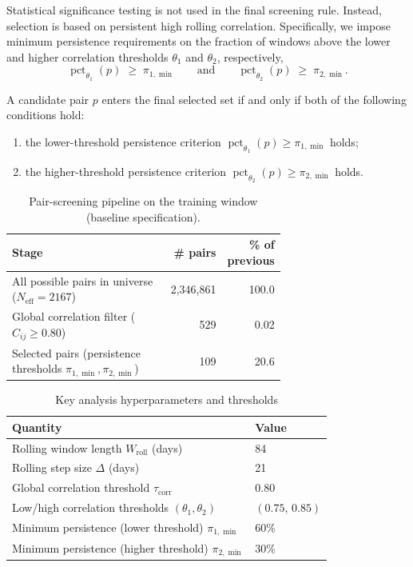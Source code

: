 \documentclass[11pt,a4paper]{article}
\begin{document}
Statistical significance testing is not used in the final screening rule.
Instead, selection is based on persistent high rolling correlation. Specifically,
we impose minimum persistence requirements on the fraction of windows above the
lower and higher correlation thresholds \(\theta_1\) and \(\theta_2\),
respectively,
\[
  \operatorname{pct}_{\theta_1}(p)
  \;\ge\;
  \pi_{1,\min}
  \qquad\text{and}\qquad
  \operatorname{pct}_{\theta_2}(p)
  \;\ge\;
  \pi_{2,\min}.
\]

A candidate pair \(p\) enters the final selected set if and only if both of the
following conditions hold:
\begin{enumerate}[noitemsep]
  \item the lower-threshold persistence criterion
        \(\operatorname{pct}_{\theta_1}(p) \ge \pi_{1,\min}\) holds;
  \item the higher-threshold persistence criterion
        \(\operatorname{pct}_{\theta_2}(p) \ge \pi_{2,\min}\) holds.
\end{enumerate}

\begin{table}[ht]
  \centering
  \caption{Pair-screening pipeline on the training window (baseline specification).}
  \label{tab:pair_screening_pipeline}
  \begin{tabular}{p{0.68\linewidth}rr}
    \toprule
    Stage & \# pairs & \% of previous \\
    \midrule
    All possible pairs in universe (\(N_{\text{eff}} = 2167\))
      & 2{,}346{,}861 & 100.0 \\
    Global correlation filter (\(C_{ij} \ge 0.80\))
      & 529 & 0.02 \\
    Selected pairs (persistence thresholds \(\pi_{1,\min},\pi_{2,\min}\))
      & 109 & 20.6 \\
    \bottomrule
  \end{tabular}
\end{table}

\begin{table}[ht]
  \centering
  \caption{Key analysis hyperparameters and thresholds}
  \label{tab:analysis_hyperparams}
  \begin{tabular}{ll}
    \toprule
    Quantity & Value \\
    \midrule
    Rolling window length \(W_{\text{roll}}\) (days) & 84 \\
    Rolling step size \(\Delta\) (days) & 21 \\
    Global correlation threshold \(\tau_{\text{corr}}\) & 0.80 \\
    Low/high correlation thresholds \((\theta_1, \theta_2)\) & \((0.75,\, 0.85)\) \\
    Minimum persistence (lower threshold) \(\pi_{1,\min}\) & \(60\%\) \\
    Minimum persistence (higher threshold) \(\pi_{2,\min}\) & \(30\%\) \\
    \bottomrule
  \end{tabular}
\end{table}
\end{document}
